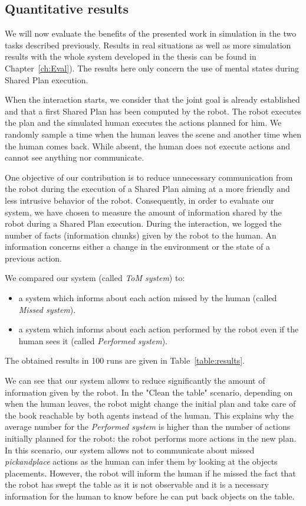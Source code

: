 \documentclass[english,a4paper,11pt,twoside]{StyleThese}
\begin{document}
\subsection{Quantitative results}

We will now evaluate the benefits of the presented work in simulation in the two tasks described previously. Results in real situations as well as more simulation results with the whole system developed in the thesis can be found in Chapter~\ref{ch:Eval}). The results here only concern the use of mental states during Shared Plan execution.

When the interaction starts, we consider that the joint goal is already established and that a first Shared Plan has been computed by the robot. The robot executes the plan and the simulated human executes the actions planned for him. We randomly sample a time when the human leaves the scene and another time when the human comes back. While absent, the human does not execute actions and cannot see anything nor communicate.

One objective of our contribution is to reduce unnecessary communication from the robot during the execution of a Shared Plan aiming at a more friendly and less intrusive behavior of the robot. Consequently, in order to evaluate our system, we have chosen to measure the amount of information shared by the robot during a Shared Plan execution. During the interaction, we logged the number of facts (information chunks) given by the robot to the human. An information concerns either a change in the environment or the state of a previous action. 

We compared our system (called \textit{ToM system}) to:
\begin{itemize}
\item a system which informs about each action missed by the human (called \textit{Missed system}).
\item a system which informs about each action performed by the robot even if the human sees it (called \textit{Performed system}).
\end{itemize}

The obtained results in 100 runs are given in Table~\ref{table:results}.

We can see that our system allows to reduce significantly the amount of information given by the robot. In the "Clean the table" scenario, depending on when the human leaves, the robot might change the initial plan and take care of the book reachable by both agents instead of the human. This explains why the average number for the \textit{Performed system} is higher than the number of actions initially planned for the robot: the robot performs more actions in the new plan. In this scenario, our system allows not to communicate about missed \textit{pickandplace} actions as the human can infer them by looking at the objects placements. However, the robot will inform the human if he missed the fact that the robot has swept the table as it is not observable and it is a necessary information for the human to know before he can put back objects on the table.
\end{document}
